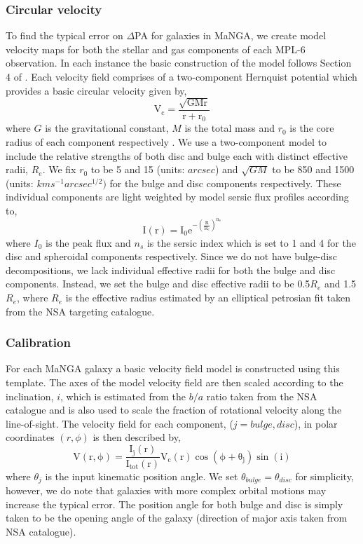 \subsubsection{Circular velocity}
To find the typical error on $\Delta$PA for galaxies in MaNGA, we create model velocity maps for both the stellar and gas components of each MPL-6 observation. In each instance the basic construction of the model follows Section 4 of \citet{krajnovic2006}. Each velocity field comprises of a two-component Hernquist potential which provides a basic circular velocity given by,
\begin{equation}
\mathrm{V_c = \frac{\sqrt{GMr}}{r+r_0}}
\end{equation}
where $G$ is the gravitational constant, $M$ is the total mass and $r_0$ is the core radius of each component respectively \citep{hernquist1990}. We use a two-component model to include the relative strengths of both disc and bulge each with distinct effective radii, $R_e$. We fix $r_0$ to be 5 and 15 (units: $arcsec$) and $\sqrt{GM}$ to be 850 and 1500 (units: $km s^{-1} arcsec^{1/2}) $ for the bulge and disc components respectively. These individual components are light weighted by model sersic flux profiles according to,
\begin{equation}
\mathrm{I(r) = I_0 e^{-\left(\frac{R}{R_e}\right)^{n_s}}}
\end{equation}
where $I_{0}$ is the peak flux and $n_s$ is the sersic index which is set to 1 and 4 for the disc and spheroidal components respectively. Since we do not have bulge-disc decompositions, we lack individual effective radii for both the bulge and disc components. Instead, we set the bulge and disc effective radii to be 0.5$R_e$ and 1.5$R_e$, where $R_e$ is the effective radius estimated by an elliptical petrosian fit taken from the NSA targeting catalogue. 

\subsubsection{Calibration}
For each MaNGA galaxy a basic velocity field model is constructed using this template. The axes of the model velocity field are then scaled according to the inclination, $i$, which is estimated from the $b/a$ ratio taken from the NSA catalogue and is also used to scale the fraction of rotational velocity along the line-of-sight. The velocity field for each component, ($j=bulge,disc$), in polar coordinates $(r,\phi)$ is then described by,
\begin{equation}
\mathrm{V(r,\phi) = \frac{I_{j}(r)}{I_{tot}(r)}V_{c}(r)\cos(\phi+\theta_{j})\sin(i)}
\end{equation}
where $\theta_j$ is the input kinematic position angle. We set $\theta_{bulge} = \theta_{disc}$ for simplicity, however, we do note that galaxies with more complex orbital motions may increase the typical error. The position angle for both bulge and disc is simply taken to be the opening angle of the galaxy (direction of major axis taken from NSA catalogue). 


